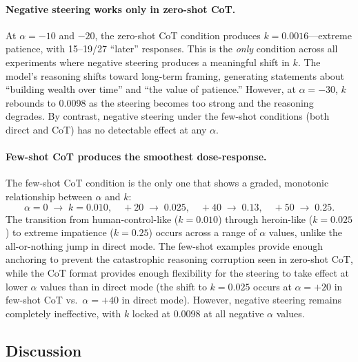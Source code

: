 \paragraph{Negative steering works only in zero-shot CoT.} At $\alpha = -10$ and $-20$, the zero-shot CoT condition produces $k = 0.0016$---extreme patience, with 15--19/27 ``later'' responses. This is the \emph{only} condition across all experiments where negative steering produces a meaningful shift in $k$. The model's reasoning shifts toward long-term framing, generating statements about ``building wealth over time'' and ``the value of patience.'' However, at $\alpha = -30$, $k$ rebounds to 0.0098 as the steering becomes too strong and the reasoning degrades. By contrast, negative steering under the few-shot conditions (both direct and CoT) has no detectable effect at any $\alpha$.

\paragraph{Few-shot CoT produces the smoothest dose-response.} The few-shot CoT condition is the only one that shows a graded, monotonic relationship between $\alpha$ and $k$:
\begin{equation*}
\alpha = 0 \;\to\; k = 0.010, \quad
+20 \;\to\; 0.025, \quad
+40 \;\to\; 0.13, \quad
+50 \;\to\; 0.25.
\end{equation*}
The transition from human-control-like ($k = 0.010$) through heroin-like ($k = 0.025$) to extreme impatience ($k = 0.25$) occurs across a range of $\alpha$ values, unlike the all-or-nothing jump in direct mode. The few-shot examples provide enough anchoring to prevent the catastrophic reasoning corruption seen in zero-shot CoT, while the CoT format provides enough flexibility for the steering to take effect at lower $\alpha$ values than in direct mode (the shift to $k = 0.025$ occurs at $\alpha = +20$ in few-shot CoT vs.\ $\alpha = +40$ in direct mode). However, negative steering remains completely ineffective, with $k$ locked at 0.0098 at all negative $\alpha$ values.

\subsection{Discussion}

